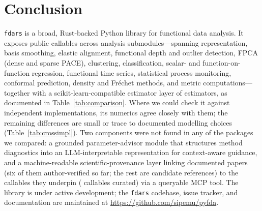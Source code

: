 \section{Conclusion}

\texttt{fdars} is a broad, Rust-backed Python library for functional data
analysis.
It exposes \npubliccallables{} public callables across \nsubmodules{}
analysis submodules---spanning representation, basis smoothing, elastic alignment, functional
depth and outlier detection, FPCA (dense and sparse PACE), clustering,
classification, scalar- and function-on-function regression, functional time
series, statistical process monitoring, conformal prediction, density and
Fr\'{e}chet methods, and metric computations---together with a scikit-learn-compatible estimator layer of
\nsklearnestimators{} estimators, as documented in Table~\ref{tab:comparison}.
Where we could check it against independent implementations, its numerics
agree closely with them; the remaining differences are small or trace to
documented modelling choices (Table~\ref{tab:crossimpl}).
Two components were not found in any of the packages we compared: a grounded parameter-advisor module that structures method
diagnostics into an LLM-interpretable representation for context-aware guidance,
and a machine-readable scientific-provenance layer linking \ndocpapers{}
documented papers (six of them author-verified so far; the rest are candidate
references) to the callables they underpin (\ncoverage{} callables curated)
via a queryable MCP tool.
The library is under active development; the \texttt{fdars} codebase, issue
tracker, and documentation are maintained at
\url{https://github.com/sipemu/pyfda}.
